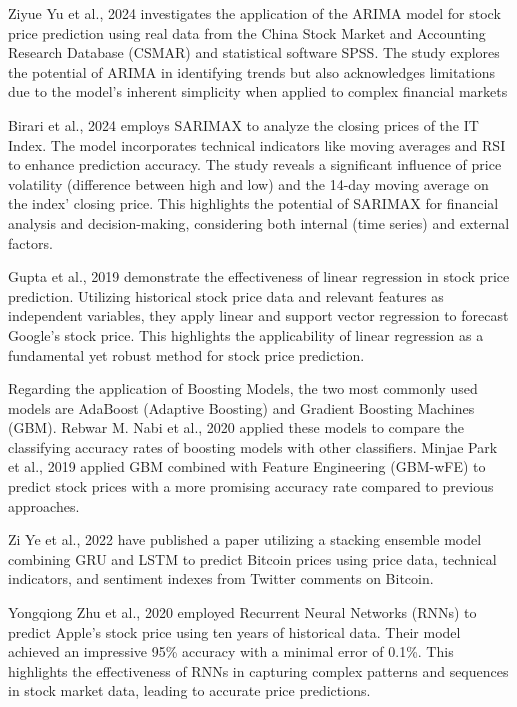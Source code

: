 \documentclass[conference]{IEEEtran}
\begin{document}
Ziyue Yu et al., 2024 \cite{arima} investigates the application of the ARIMA model for stock price prediction using real data from the China Stock Market and Accounting Research Database (CSMAR) and statistical software SPSS. The study explores the potential of ARIMA in identifying trends but also acknowledges limitations due to the model's inherent simplicity when applied to complex financial markets

Birari et al., 2024 \cite{sarimax} employs SARIMAX to analyze the closing prices of the IT Index. The model incorporates technical indicators like moving averages and RSI to enhance prediction accuracy. The study reveals a significant influence of price volatility (difference between high and low) and the 14-day moving average on the index' closing price. This highlights the potential of SARIMAX for financial analysis and decision-making, considering both internal (time series) and external factors.

Gupta et al., 2019 \cite{linear} demonstrate the effectiveness of linear regression in stock price prediction. Utilizing historical stock price data and relevant features as independent variables, they apply linear and support vector regression to forecast Google's stock price. This highlights the applicability of linear regression as a fundamental yet robust method for stock price prediction.

Regarding the application of Boosting Models, the two most commonly used models are AdaBoost (Adaptive Boosting) and Gradient Boosting Machines (GBM). Rebwar M. Nabi et al., 2020 \cite{adaboost} applied these models to compare the classifying accuracy rates of boosting models with other classifiers. Minjae Park et al., 2019 \cite{gbm} applied GBM combined with Feature Engineering (GBM-wFE) to predict stock prices with a more promising accuracy rate compared to previous approaches.

Zi Ye et al., 2022 \cite{stacking} have published a paper utilizing a stacking ensemble model combining GRU and LSTM to predict Bitcoin prices using price data, technical indicators, and sentiment indexes from Twitter comments on Bitcoin.

Yongqiong Zhu et al., 2020 \cite{rnn} employed Recurrent Neural Networks (RNNs) to predict Apple's stock price using ten years of historical data. Their model achieved an impressive 95\% accuracy with a minimal error of 0.1\%. This highlights the effectiveness of RNNs in capturing complex patterns and sequences in stock market data, leading to accurate price predictions. 
\end{document}
